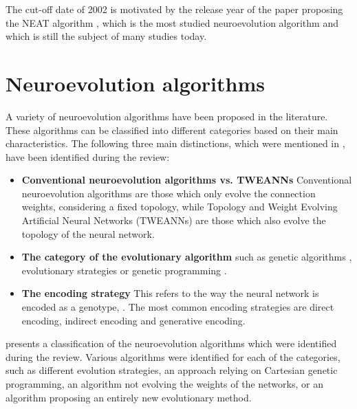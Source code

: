 The cut-off date of 2002 is motivated by the release year of the paper proposing the NEAT algorithm \cite{neat}, which is the most studied neuroevolution algorithm and which
is still the subject of many studies today.

\section{Neuroevolution algorithms}

A variety of neuroevolution algorithms have been proposed in the literature.
These algorithms can be classified into different categories based on their main characteristics.
The following three main distinctions, which were mentioned in , have been identified during the review:

\begin{itemize}
    \item \textbf{Conventional neuroevolution algorithms vs. TWEANNs} Conventional neuroevolution algorithms are those which only evolve the connection weights,
        considering a fixed topology, while Topology and Weight Evolving Artificial Neural Networks (TWEANNs) \cite{neat} are those which also evolve the topology of the
        neural network.
    \item \textbf{The category of the evolutionary algorithm} such as genetic algorithms \cite{genetic_alg,genetic_alg_review}, evolutionary strategies \cite{es_intro} or
        genetic programming \cite{cartesian_gp}.
    \item \textbf{The encoding strategy} This refers to the way the neural network is encoded as a genotype, \cite{neuroevolution_learning,neuroevolution_trends,neuroevolution_survey}.
        The most common encoding strategies are direct encoding, indirect encoding and generative encoding.
\end{itemize}

 presents a classification of the neuroevolution algorithms which were identified during the review.
Various algorithms were identified for each of the categories, such as different evolution strategies, an approach relying on Cartesian genetic programming, an algorithm not evolving the
weights of the networks, or an algorithm proposing an entirely new evolutionary method.

